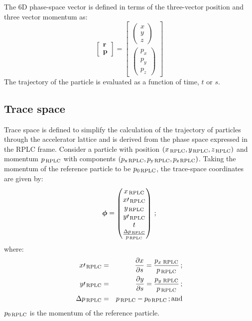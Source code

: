 The 6D phase-space vector is defined in terms of the three-vector
position and three vector momentum as:
\begin{equation}
  \begin{bmatrix} \bm{r} \\ \bm{p} \end{bmatrix} = 
  \begin{bmatrix} \begin{pmatrix} x   \\   y \\ z   \end{pmatrix} \\
                  \begin{pmatrix} p_x \\ p_y \\ p_z \end{pmatrix} \end{bmatrix}
\end{equation}
The trajectory of the particle is evaluated as a function of time,
$t$ or $s$.

\subsection{Trace space}

Trace space is defined to simplify the calculation of the trajectory
of particles through the accelerator lattice and is derived from the
phase space expressed in the RPLC frame.
Consider a particle with position
$(x_{\rm\,RPLC}, y_{\rm\,RPLC}, z_{\rm\,RPLC})$ and momentum 
$p_{\rm\,RPLC}$ with components
$(p_{\rm x\,RPLC}, p_{\rm y\,RPLC}, p_{\rm z\,RPLC})$.
Taking the momentum of the reference particle to be
$p_{0 {\rm\,RPLC}}$, the trace-space coordinates are given by:
\begin{equation}
    \bm{\phi} = \begin{pmatrix}
                  x_{\rm\,RPLC}       \\
                  x\prime_{\rm\,RPLC} \\
                  y_{\rm\,RPLC}       \\
                  y\prime_{\rm\,RPLC} \\
                  t                 \\
                  \frac{\Delta p_{\rm\,RPLC}}{p_{\rm\,RPLC}}
                \end{pmatrix} \, ;
\end{equation}
where:
\begin{eqnarray}
  x\prime_{\rm\,RPLC}  & = & \frac{\partial x}{\partial s} = \frac{p_{x\,{\rm\,RPLC}}}{p_{\rm\,RPLC}} \, ; \\
  y\prime_{\rm\,RPLC}  & = & \frac{\partial y}{\partial s} = \frac{p_{y\,{\rm\,RPLC}}}{p_{\rm\,RPLC}} \, ; \\
  \Delta p_{\rm\,RPLC} & = & p_{\rm\,RPLC} - p_{0 {\rm\,RPLC}} \, {\rm ; and}
\end{eqnarray}
$p_{0 {\rm\,RPLC}}$ is the momentum of the reference particle.

